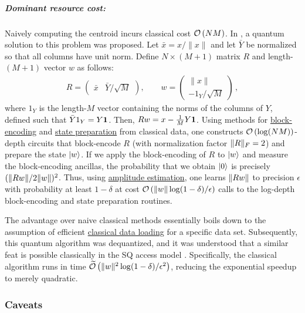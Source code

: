 \begin{refsection}
\subparagraph{Dominant resource cost:} Naively computing the centroid incurs classical cost $\mathcal{O}\left( NM \right)$. In \cite{lloyd2013quantum}, a quantum solution to this problem was proposed. Let $\bar{x}=x/\lVert x\rVert$
and let $\bar{Y}$ be normalized  so that all columns have unit norm. Define $N \times (M+1)$ matrix $R$ and length-$(M+1)$ vector $w$ as follows:
\begin{align}
    R=\begin{pmatrix}\bar{x} & \bar{Y}/\sqrt{M}\end{pmatrix}, \qquad
    w = \begin{pmatrix} \lVert x \rVert \\
    -1_Y/\sqrt{M}\end{pmatrix}\,,
\end{align} 
where $1_Y$ is the length-$M$ vector containing the norms of the columns of $Y$, defined such that $\bar{Y}1_Y=Y\mathbf{1}$. Then, $Rw=x-\frac{1}{M} Y\mathbf{1}$. Using methods for \hyperref[prim:BlockEncodingsClassical]{block-encoding} and \hyperref[prim:StatePrepData]{state preparation} from classical data, one constructs $\mathcal{O}\left( \log(NM) \right)$-depth circuits that block-encode $R$ (with normalization factor $\lVert R\rVert_F = 2$) and prepare the state $\lvert w\rangle$. If we apply the block-encoding of $R$ to $\lvert w\rangle$ and measure the block-encoding ancillas, the probability that we obtain $\lvert0\rangle$ is precisely $(\lVert Rw\rVert/2\lVert w\rVert)^2$. Thus, using \hyperref[prim:AmpEst]{amplitude estimation}, one learns $\lVert Rw\rVert$ to precision $\epsilon$ with probability at least $1-\delta$ at cost $\mathcal{O}\left( \lVert w\rVert\log(1-\delta)/\epsilon \right)$ calls to the log-depth block-encoding and state preparation routines. 

The advantage over naive classical methods essentially boils down to the assumption of efficient \hyperref[prim:StatePrepData]{classical data loading} for a specific data set. Subsequently, this quantum algorithm was dequantized, and it was understood that a similar feat is possible classically in the SQ access model \cite{tang2018QInspiredClassAlgPCA}. Specifically, the classical algorithm runs in time $\widetilde{\mathcal{O}}\left( \lVert w\rVert^2\log(1-\delta)/\epsilon^2 \right)$, reducing the exponential speedup to merely quadratic.  



\subsubsection*{Caveats}


\end{refsection}
